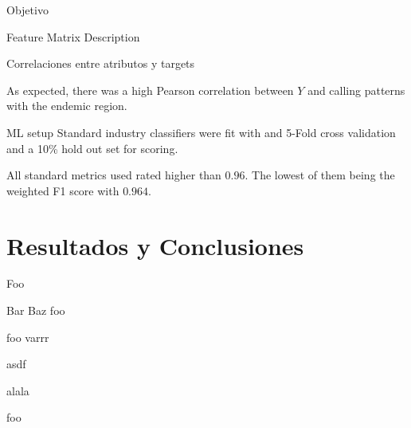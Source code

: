 \documentclass[xcolor=x11names]{beamer}
\begin{document}
\begin{frame}{Objetivo}
\begin{frame}{Feature Matrix Description}
	\begin{block}{Correlaciones entre atributos y targets}

	As expected, there was a high Pearson correlation between $Y$ and calling patterns with the endemic region.
	\end{block}

\end{frame}


\begin{frame}{ ML setup}
			Standard industry classifiers were fit with
			and 5-Fold cross validation and a 10\% hold out set for scoring.

			\medskip

			All standard metrics used rated higher than $0.96$. The lowest of them being the weighted F1 score with $0.964$.

%
\end{frame}


\section{Resultados y Conclusiones}

%
%
%
%

\begin{frame}{Foo}
	\begin{block}{Bar}
		Baz
		\medskip
		foo
	\end{block}


	\begin{block}{foo}
		varrr

		\medskip
			asdf

		\medskip
		alala

		\medskip
		foo
	\end{block}
\end{frame}


\end{frame}
\end{document}
